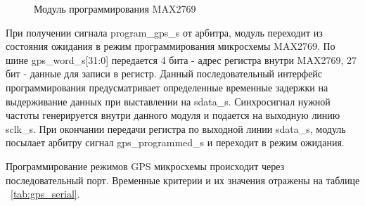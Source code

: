 \begin{figure}[H]
\begin{center}
\end{center}
\caption{Модуль программирования MAX2769}
\label{pic:gps_program}
\end{figure}

При получении сигнала program\_gps\_s от арбитра, модуль переходит из состояния ожидания в режим программирования микросхемы
MAX2769. По шине gps\_word\_s[31:0] передается 4 бита - адрес регистра внутри MAX2769, 27 бит - данные для записи в регистр.
Данный последовательный интерфейс программирования предусматривает определенные временные задержки на выдерживание данных
при выставлении на sdata\_s. Синхросигнал нужной частоты генерируется внутри данного модуля и подается на выходную линию sclk\_s.
При окончании передачи регистра по выходной линии sdata\_s, модуль посылает арбитру сигнал gps\_programmed\_s и переходит в режим
ожидания.

Программирование режимов GPS микросхемы происходит через последовательный порт. Временные критерии и их значения
отражены на таблице ~\ref{tab:gps_serial}.


